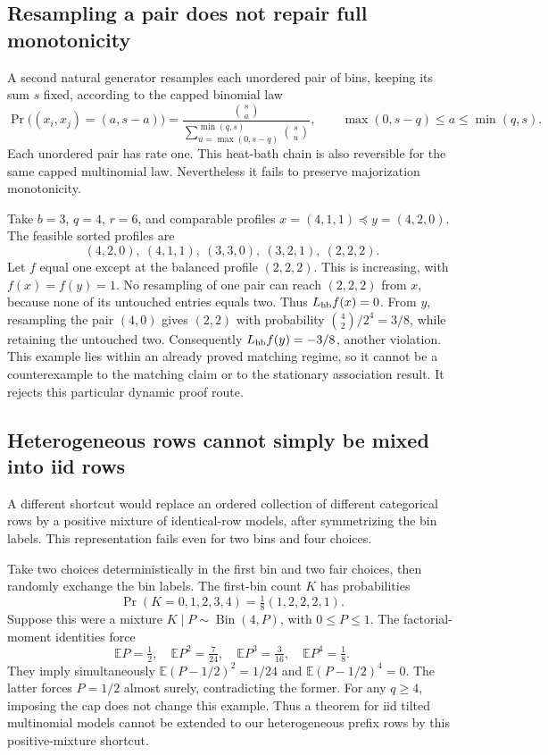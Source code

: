 \documentclass[11pt]{article}
\begin{document}
\subsection{Resampling a pair does not repair full monotonicity}
A second natural generator resamples each unordered pair of bins,
keeping its sum $s$ fixed, according to the capped binomial law
\[
 \Pr\bigl((x_i,x_j)=(a,s-a)\bigr)
 =\frac{\binom sa}{\sum_{u=\max(0,s-q)}^{\min(q,s)}\binom su},
 \qquad \max(0,s-q)\leq a\leq\min(q,s).
\]
Each unordered pair has rate one. This heat-bath chain is also
reversible for the same capped multinomial law. Nevertheless it
fails to preserve majorization monotonicity.

Take $b=3$, $q=4$, $r=6$, and comparable profiles
$x=(4,1,1)\preceq y=(4,2,0)$. The feasible sorted profiles are
\[
 (4,2,0),\ (4,1,1),\ (3,3,0),\ (3,2,1),\ (2,2,2).
\]
Let $f$ equal one except at the balanced profile $(2,2,2)$.
This is increasing, with $f(x)=f(y)=1$.
No resampling of one pair can reach $(2,2,2)$ from $x$, because
none of its untouched entries equals two. Thus $L_{\rm hb}f(x)=0$.
From $y$, resampling the pair $(4,0)$ gives $(2,2)$ with probability
$\binom42/2^4=3/8$, while retaining the untouched two.
Consequently $L_{\rm hb}f(y)=-3/8$, another violation.
This example lies within an already proved matching regime, so it
cannot be a counterexample to the matching claim or to the stationary
association result. It rejects this particular dynamic proof route.

\subsection{Heterogeneous rows cannot simply be mixed into iid rows}
A different shortcut would replace an ordered collection of different
categorical rows by a positive mixture of identical-row models,
after symmetrizing the bin labels. This representation fails even
for two bins and four choices.

Take two choices deterministically in the first bin and two fair
choices, then randomly exchange the bin labels. The first-bin count
$K$ has probabilities
\[
 \Pr(K=0,1,2,3,4)=\tfrac18(1,2,2,2,1).
\]
Suppose this were a mixture $K\mid P\sim\operatorname{Bin}(4,P)$,
with $0\leq P\leq1$. The factorial-moment identities force
\[
 \mathbb EP=\tfrac12,\quad
 \mathbb EP^2=\tfrac7{24},\quad
 \mathbb EP^3=\tfrac3{16},\quad
 \mathbb EP^4=\tfrac18.
\]
They imply simultaneously
$\mathbb E(P-1/2)^2=1/24$ and $\mathbb E(P-1/2)^4=0$.
The latter forces $P=1/2$ almost surely, contradicting the former.
For any $q\geq4$, imposing the cap does not change this example.
Thus a theorem for iid tilted multinomial models cannot be extended
to our heterogeneous prefix rows by this positive-mixture shortcut.
\end{document}
